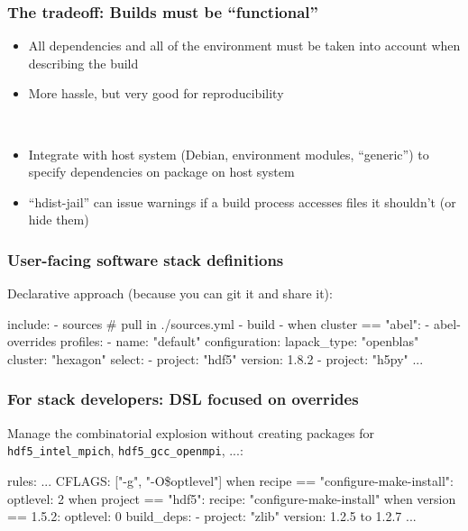 \documentclass[sans,mathserif]{beamer}
\begin{document}
\begin{frame}
  \frametitle{The tradeoff: Builds must be ``functional''}
  \begin{itemize}
  \item<+-> All dependencies and all of the environment must be
    taken into account when describing the build
  \item<+-> More hassle, but very good for reproducibility
  \end{itemize}
~
~
\begin{itemize}
\item<+-> Integrate with host system (Debian, environment modules,
  ``generic'') to specify dependencies on package on host system
\item<+-> ``hdist-jail'' can issue warnings if a build process
  accesses files it shouldn't (or hide them)
\end{itemize}
\end{frame}

\begin{frame}[fragile]
\frametitle{User-facing software stack definitions}
Declarative approach (because you can git it and share it):

{\small

\begin{semiverbatim}
include:
  - sources # pull in ./sources.yml
  - build
  - when cluster == "abel":
    - abel-overrides
profiles:
  - name: "default"
    configuration:
      lapack_type: "openblas"
      cluster: "hexagon"
    select:
      - project: "hdf5"
        version: 1.8.2
      - project: "h5py"
        ...
\end{semiverbatim}
}
\end{frame}

\begin{frame}[fragile]
\frametitle{For stack developers: DSL focused on overrides}

Manage the combinatorial explosion without creating
packages for {\tt hdf5\_intel\_mpich}, {\tt hdf5\_gcc\_openmpi}, ...:
{

\begin{semiverbatim}
rules:
  ...
  CFLAGS: ["-g", "-O\$optlevel"]
  when recipe == "configure-make-install":
    optlevel: 2
  when project == "hdf5":
    recipe: "configure-make-install"
    when version == 1.5.2:
      optlevel: 0
    build_deps:
      - project: "zlib"
        version: 1.2.5 to 1.2.7
  ...
\end{semiverbatim}
}
\end{frame}
\end{document}
